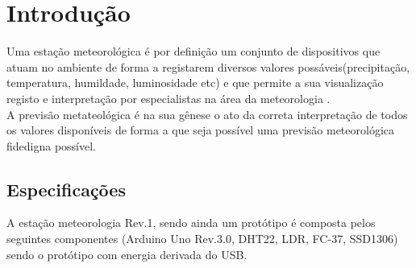 \documentclass[12pt,a4paper,portrait]{article}
\begin{document}
	
	\tableofcontents
	
	
	\newpage
	\section{Introdução}
		Uma estação meteorológica é por definição um conjunto de dispositivos que atuam no ambiente de forma a registarem diversos valores possáveis(precipitação, temperatura, humildade, luminosidade etc) e que permite a sua visualização registo e interpretação por especialistas na área da meteorologia .\\
		A previsão metateológica é na sua gênese o ato da correta interpretação de todos os valores disponíveis de forma a que seja possível uma previsão meteorológica fidedigna possível.
		\subsection{Especificações}
			A estação meteorologia Rev.1, sendo ainda um protótipo é composta pelos seguintes componentes (Arduino Uno Rev.3.0, DHT22, LDR, FC-37, SSD1306) sendo o protótipo com energia derivada do USB. \\
\end{document}
